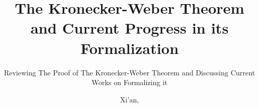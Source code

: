 


\supervisor{ }
\supervisormail{ }
\supervisortitle{ } %



\title{The Kronecker-Weber Theorem and Current Progress in its Formalization}

\subtitle{Reviewing The Proof of The Kronecker-Weber Theorem and Discussing Current Works on Formalizing it}






\date{Xi'an, \DTMmonthname{\month} \number\year}